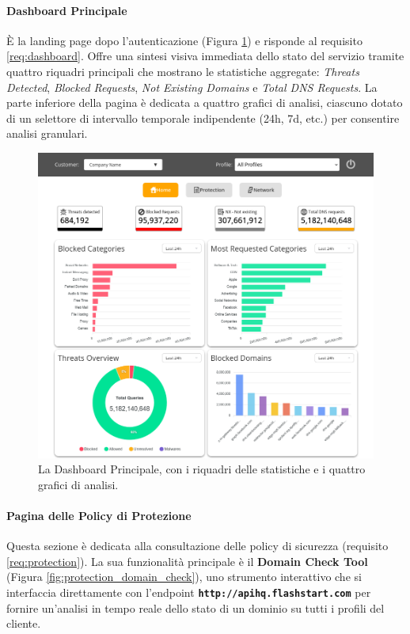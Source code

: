 \documentclass[12pt,a4paper,openright,twoside]{book}
\begin{document}
\paragraph{Dashboard Principale}
È la landing page dopo l'autenticazione (Figura \ref{fig:dashboard_page}) e risponde al requisito \ref{req:dashboard}. Offre una sintesi visiva immediata dello stato del servizio tramite quattro riquadri principali che mostrano le statistiche aggregate: \textit{Threats Detected}, \textit{Blocked Requests}, \textit{Not Existing Domains} e \textit{Total DNS Requests}. La parte inferiore della pagina è dedicata a quattro grafici di analisi, ciascuno dotato di un selettore di intervallo temporale indipendente (24h, 7d, etc.) per consentire analisi granulari.

\begin{figure}[htbp]
    \centering
    \includegraphics[width=\textwidth]{figures/home.png}
    \caption{La Dashboard Principale, con i riquadri delle statistiche e i quattro grafici di analisi.}
    \label{fig:dashboard_page}
\end{figure}

\FloatBarrier
\paragraph{Pagina delle Policy di Protezione}
Questa sezione è dedicata alla consultazione delle policy di sicurezza (requisito \ref{req:protection}). La sua funzionalità principale è il \textbf{Domain Check Tool} (Figura \ref{fig:protection_domain_check}), uno strumento interattivo che si interfaccia direttamente con l'endpoint \textbf{\texttt{http://apihq.flashstart.com}} per fornire un'analisi in tempo reale dello stato di un dominio su tutti i profili del cliente.
\end{document}
